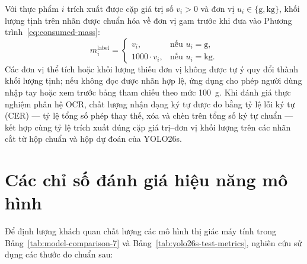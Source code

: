 Với thực phẩm $i$ trích xuất được cặp giá trị số $v_i > 0$ và đơn vị $u_i \in \{\mathrm{g}, \mathrm{kg}\}$, khối lượng tịnh trên nhãn được chuẩn hóa về đơn vị gam trước khi đưa vào Phương trình~\eqref{eq:consumed-mass}:
\begin{equation}
    m_i^{\mathrm{label}} =
    \begin{cases}
        v_i, & \text{nếu } u_i = \mathrm{g},\\
        1000 \cdot v_i, & \text{nếu } u_i = \mathrm{kg}.
    \end{cases}
    \label{eq:ocr-mass-unit-conversion}
\end{equation}
Các đơn vị thể tích hoặc khối lượng thiếu đơn vị không được tự ý quy đổi thành khối lượng tịnh; nếu không đọc được nhãn hợp lệ, ứng dụng cho phép người dùng nhập tay hoặc xem trước bảng tham chiếu theo mức 100~g. Khi đánh giá thực nghiệm phân hệ OCR, chất lượng nhận dạng ký tự được đo bằng tỷ lệ lỗi ký tự (CER) — tỷ lệ tổng số phép thay thế, xóa và chèn trên tổng số ký tự chuẩn — kết hợp cùng tỷ lệ trích xuất đúng cặp giá trị--đơn vị khối lượng trên các nhãn cắt từ hộp chuẩn và hộp dự đoán của YOLO26s.

\section{Các chỉ số đánh giá hiệu năng mô hình}
\label{sec:eval-metrics}

Để định lượng khách quan chất lượng các mô hình thị giác máy tính trong Bảng~\ref{tab:model-comparison-7} và Bảng~\ref{tab:yolo26s-test-metrics}, nghiên cứu sử dụng các thước đo chuẩn sau:


